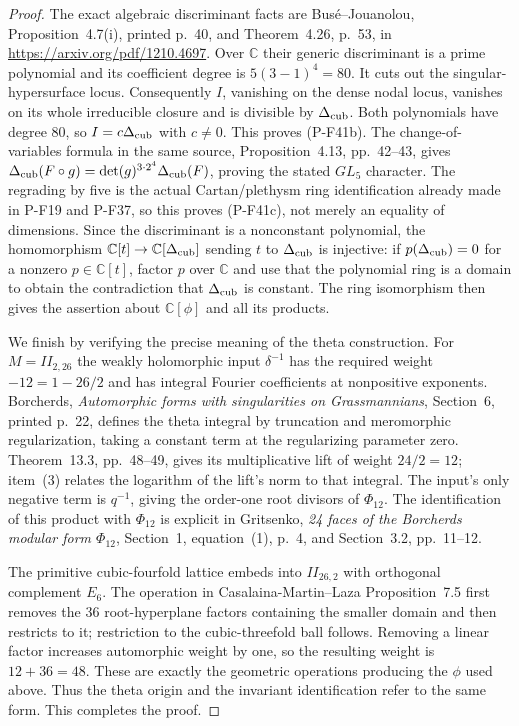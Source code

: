 \documentclass[11pt,a4paper]{article}
\begin{document}
\begin{proof}
The exact algebraic discriminant facts are
Bus\'e--Jouanolou, Proposition~4.7(i), printed p.~40,
and Theorem~4.26, p.~53, in
\url{https://arxiv.org/pdf/1210.4697}.
Over $\mathbb C$ their generic discriminant is a prime
polynomial and its coefficient degree is
$5(3-1)^4=80$. It cuts out the singular-hypersurface locus.
Consequently $I$, vanishing on the dense nodal locus,
vanishes on its whole irreducible closure and is divisible
by $\Delta_{\rm cub}$. Both polynomials have degree $80$,
so $I=c\Delta_{\rm cub}$ with $c\ne0$.
This proves (P-F41b). The change-of-variables formula in
the same source, Proposition~4.13, pp.~42--43, gives
$\Delta_{\rm cub}(F\circ g)=\det(g)^{3\cdot2^4}
\Delta_{\rm cub}(F)$, proving the stated $GL_5$ character.
The regrading by five is the actual Cartan/plethysm ring
identification already made in P-F19 and P-F37, so this
proves (P-F41c), not merely an equality of dimensions.
Since the discriminant is a nonconstant polynomial,
the homomorphism $\mathbb C[t]\to\mathbb C[\Delta_{\rm cub}]$
sending $t$ to $\Delta_{\rm cub}$ is injective:
if $p(\Delta_{\rm cub})=0$ for a nonzero $p\in\mathbb C[t]$,
factor $p$ over $\mathbb C$ and use that the polynomial
ring is a domain to obtain the contradiction that
$\Delta_{\rm cub}$ is constant.
The ring isomorphism then gives the assertion about
$\mathbb C[\phi]$ and all its products.

We finish by verifying the precise meaning of the theta
construction. For $M=II_{2,26}$ the weakly holomorphic
input $\delta^{-1}$ has the required weight $-12=1-26/2$
and has integral Fourier coefficients at nonpositive
exponents. Borcherds, \emph{Automorphic forms with
singularities on Grassmannians}, Section~6, printed p.~22,
defines the theta integral by truncation and meromorphic
regularization, taking a constant term at the regularizing
parameter zero. Theorem~13.3, pp.~48--49, gives its
multiplicative lift of weight $24/2=12$; item~(3)
relates the logarithm of the lift's norm to that integral.
The input's only negative term is $q^{-1}$, giving the
order-one root divisors of $\Phi_{12}$.
The identification of this product with $\Phi_{12}$ is
explicit in Gritsenko, \emph{24 faces of the Borcherds
modular form $\Phi_{12}$}, Section~1, equation~(1),
p.~4, and Section~3.2, pp.~11--12.

The primitive cubic-fourfold lattice embeds into
$II_{26,2}$ with orthogonal complement $E_6$.
The operation in Casalaina-Martin--Laza Proposition~7.5
first removes the $36$ root-hyperplane factors containing
the smaller domain and then restricts to it; restriction
to the cubic-threefold ball follows. Removing a linear
factor increases automorphic weight by one, so the resulting
weight is $12+36=48$. These are exactly the geometric
operations producing the $\phi$ used above. Thus the
theta origin and the invariant identification refer to
the same form. This completes the proof.
\end{proof}
\end{document}
